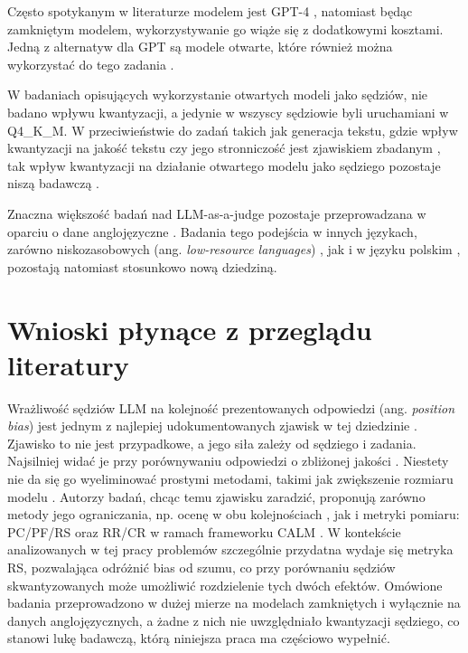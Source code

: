 \documentclass[11pt,a4paper]{article}
\begin{document}
Często spotykanym w literaturze modelem jest GPT-4 \cite{zhengetal2023c,wangetal2024,ICLR2024_afc8b034,panicksseryetal2024b}, natomiast będąc zamkniętym modelem, wykorzystywanie go wiąże się z dodatkowymi kosztami. Jedną z alternatyw dla GPT są modele otwarte, które również można wykorzystać do tego zadania \cite{kooetal2024a,normanetal2026,yangetal2026,zhouetal2026}.

W badaniach opisujących wykorzystanie otwartych modeli jako sędziów, nie badano wpływu kwantyzacji, a jedynie w \cite{angheletal2026} wszyscy sędziowie byli uruchamiani w Q4\_K\_M. W przeciwieństwie do zadań takich jak generacja tekstu, gdzie wpływ kwantyzacji na jakość tekstu czy jego stronniczość jest zjawiskiem zbadanym \cite{marchisioetal2024a,ferrara2026}, tak wpływ kwantyzacji na działanie otwartego modelu jako sędziego pozostaje niszą badawczą \cite{guetal2026a,angheletal2026}.

Znaczna większość badań nad LLM-as-a-judge pozostaje przeprowadzana w oparciu o dane anglojęzyczne \cite{dogruozetal2026a}. Badania tego podejścia w innych językach, zarówno niskozasobowych (ang. \emph{low-resource languages}) \cite{dogruozetal2026a,zhouetal2026}, jak i w języku polskim \cite{karpetal2026}, pozostają natomiast stosunkowo nową dziedziną.

\section*{Wnioski płynące z przeglądu literatury}

Wrażliwość sędziów LLM na kolejność prezentowanych odpowiedzi (ang. \emph{position bias}) jest jednym z najlepiej udokumentowanych zjawisk w tej dziedzinie \cite{zhengetal2023c,wangetal2024,shietal2025a,kooetal2024a}. Zjawisko to nie jest przypadkowe, a jego siła zależy od sędziego i zadania. Najsilniej widać je przy porównywaniu odpowiedzi o zbliżonej jakości \cite{shietal2025a}. Niestety nie da się go wyeliminować prostymi metodami, takimi jak zwiększenie rozmiaru modelu \cite{kooetal2024a}. Autorzy badań, chcąc temu zjawisku zaradzić, proponują zarówno metody jego ograniczania, np. ocenę w obu kolejnościach \cite{wangetal2024}, jak i metryki pomiaru: PC/PF/RS \cite{shietal2025a} oraz RR/CR w ramach frameworku CALM \cite{ICLR2025_fdca08d3}. W kontekście analizowanych w tej pracy problemów szczególnie przydatna wydaje się metryka RS, pozwalająca odróżnić bias od szumu, co przy porównaniu sędziów skwantyzowanych może umożliwić rozdzielenie tych dwóch efektów. Omówione badania przeprowadzono w dużej mierze na modelach zamkniętych i wyłącznie na danych anglojęzycznych, a żadne z nich nie uwzględniało kwantyzacji sędziego, co stanowi lukę badawczą, którą niniejsza praca ma częściowo wypełnić.
\end{document}
